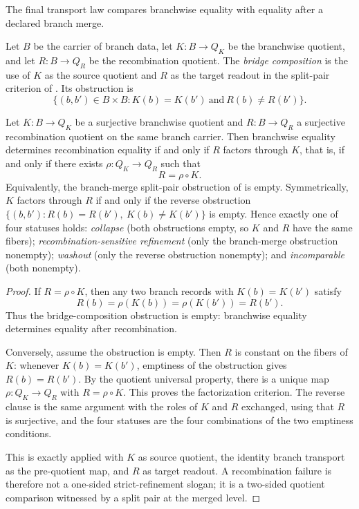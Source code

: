 The final transport law compares branchwise equality with equality
after a declared branch merge.

\begin{definition}\label{def:bridge-composition}
Let \(B\) be the carrier of branch data, let \(K:B\to Q_K\) be the
branchwise quotient, and let \(R:B\to Q_R\) be the recombination
quotient.  The \emph{bridge composition} is the use of \(K\) as the
source quotient and \(R\) as the target readout in the split-pair
criterion of .  Its obstruction is
\[
  \{(b,b')\in B\times B:
      K(b)=K(b')\ \text{and}\ R(b)\ne R(b')\}.
\]
\end{definition}

\begin{theorem}\label{thm:F5}
Let \(K:B\to Q_K\) be a surjective branchwise quotient and
\(R:B\to Q_R\) a surjective recombination quotient on the same branch
carrier.
Then branchwise equality determines recombination equality if and only
if \(R\) factors through \(K\), that is, if and only if there exists
\(\rho:Q_K\to Q_R\) such that
\[
  R=\rho\circ K .
\]
Equivalently, the branch-merge split-pair obstruction of
 is empty. Symmetrically, \(K\) factors through
\(R\) if and only if the reverse obstruction
\(\{(b,b'):R(b)=R(b'),\ K(b)\ne K(b')\}\) is empty. Hence exactly one of four
statuses holds: \emph{collapse} (both obstructions empty, so \(K\) and \(R\)
have the same fibers); \emph{recombination-sensitive refinement} (only the
branch-merge obstruction nonempty); \emph{washout} (only the reverse
obstruction nonempty); and \emph{incomparable} (both nonempty).
\end{theorem}

\begin{proof}
If \(R=\rho\circ K\), then any two branch records with
\(K(b)=K(b')\) satisfy
\[
  R(b)=\rho(K(b))=\rho(K(b'))=R(b').
\]
Thus the bridge-composition obstruction is empty: branchwise equality
determines equality after recombination.

Conversely, assume the obstruction is empty.  Then \(R\) is constant
on the fibers of \(K\): whenever \(K(b)=K(b')\), emptiness of the
obstruction gives \(R(b)=R(b')\).  By the quotient universal property,
there is a unique map \(\rho:Q_K\to Q_R\) with \(R=\rho\circ K\).
This proves the factorization criterion. The reverse clause is the same
argument with the roles of \(K\) and \(R\) exchanged, using that \(R\) is
surjective, and the four statuses are the four combinations of the two
emptiness conditions.

This is exactly  applied with \(K\) as source quotient,
the identity branch transport as the pre-quotient map, and \(R\) as
target readout.  A recombination failure is therefore not a one-sided
strict-refinement slogan; it is a two-sided quotient comparison
witnessed by a split pair at the merged level.
\end{proof}

